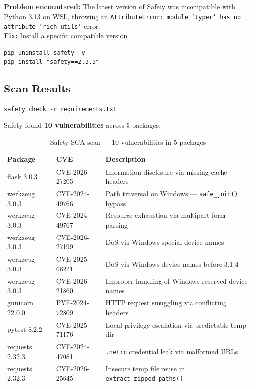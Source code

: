 \documentclass[12pt,a4paper]{report}
\begin{document}
\begin{warningbox}
\textbf{Problem encountered:} The latest version of Safety was incompatible with Python 3.13 on WSL, throwing an \texttt{AttributeError: module 'typer' has no attribute 'rich\_utils'} error.\\[4pt]
\textbf{Fix:} Install a specific compatible version:
\begin{lstlisting}[style=bashstyle]
pip uninstall safety -y
pip install "safety==2.3.5"
\end{lstlisting}
\end{warningbox}

\subsection{Scan Results}

\begin{lstlisting}[style=bashstyle, caption={Running Safety SCA scan}]
safety check -r requirements.txt
\end{lstlisting}

Safety found \textbf{10 vulnerabilities} across 5 packages:

\begin{table}[H]
\centering
\begin{tabularx}{\textwidth}{l l X}
\toprule
\textbf{Package} & \textbf{CVE} & \textbf{Description} \\
\midrule
flask 3.0.3 & CVE-2026-27205 & Information disclosure via missing cache headers \\
werkzeug 3.0.3 & CVE-2024-49766 & Path traversal on Windows — \texttt{safe\_join()} bypass \\
werkzeug 3.0.3 & CVE-2024-49767 & Resource exhaustion via multipart form parsing \\
werkzeug 3.0.3 & CVE-2026-27199 & DoS via Windows special device names \\
werkzeug 3.0.3 & CVE-2025-66221 & DoS via Windows device names before 3.1.4 \\
werkzeug 3.0.3 & CVE-2026-21860 & Improper handling of Windows reserved device names \\
gunicorn 22.0.0 & PVE-2024-72809 & HTTP request smuggling via conflicting headers \\
pytest 8.2.2 & CVE-2025-71176 & Local privilege escalation via predictable temp dir \\
requests 2.32.3 & CVE-2024-47081 & \texttt{.netrc} credential leak via malformed URLs \\
requests 2.32.3 & CVE-2026-25645 & Insecure temp file reuse in \texttt{extract\_zipped\_paths()} \\
\bottomrule
\end{tabularx}
\caption{Safety SCA scan — 10 vulnerabilities in 5 packages}
\end{table}
\end{document}
